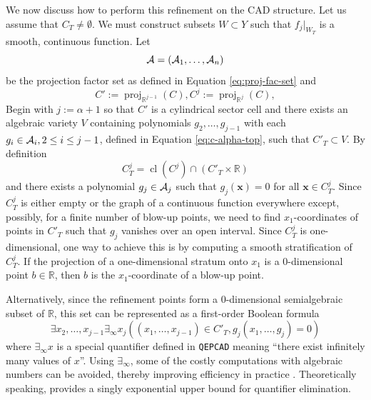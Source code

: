 \documentclass[
]{book}
\theoremstyle{definition}
\theoremstyle{definition}
\theoremstyle{definition}
\theoremstyle{definition}
\theoremstyle{remark}
\begin{document}
We now discuss how to perform this refinement on the CAD structure. Let us assume that \(C_T\ne \emptyset\). We must construct subsets \(W \subset Y\) such that \(f_j\vert_{W_T}\) is a smooth, continuous function.
Let
\[
{\cal A} = ({\cal A}_1, \ldots, {\cal A}_n)
\]
be the projection factor set as defined in Equation \eqref{eq:proj-fac-set} and
\[
C' := {\operatorname{proj}_{\mathbb{R}^{j-1}}}(C), C^j := {\operatorname{proj}_{\mathbb{R}^{j}}}(C),
\]
Begin with \(j := \alpha+1\) so that \(C'\) is a cylindrical sector cell and there exists an algebraic variety \(V\) containing polynomials \(g_2,\ldots,g_{j-1}\) with each \(g_i \in {\cal A}_i, 2 \le i \le j-1\), defined in Equation \eqref{eq:c-alpha-top}, such that \(C'_T\subset V\).
By definition \[
C^j_T = {\operatorname{cl} \left( C^j \right)} \cap (C'_T \times \mathbb{R})
\] and there exists a polynomial \(g_j \in {\cal A}_j\) such that \(g_j(\mathbf{x}) = 0\) for all \(\mathbf{x} \in C^j_T\). Since \(C^j_T\) is either empty or the graph of a continuous function everywhere except, possibly, for a finite number of blow-up points, we need to find \(x_1\)-coordinates of points in \(C'_T\) such that \(g_j\) vanishes over an open interval.
Since \(C^j_T\) is one-dimensional, one way to achieve this is by computing a smooth stratification of \(C^j_T\). If the projection of a one-dimensional stratum onto \(x_1\) is a \(0\)-dimensional point \(b \in \mathbb{R}\), then \(b\) is the \(x_1\)-coordinate of a blow-up point.

Alternatively, since the refinement points form a \(0\)-dimensional semialgebraic subset of \(\mathbb{R}\), this set can be represented as a first-order Boolean formula
\[
\exists x_2,\ldots,x_{j-1} \exists_\infty x_j ((x_1,\ldots,x_{j-1}) \in C'_T, g_j(x_1,\ldots,g_j) = 0)
\]
where \(\exists_\infty x\) is a special quantifier defined in \texttt{QEPCAD} meaning ``there exist infinitely many values of \(x\)''.
Using \(\exists_\infty\), some of the costly computations with algebraic numbers can be avoided, thereby improving efficiency in practice \citep{qepcadDocs}.
Theoretically speaking, \citep[Algorithm 14.21]{bpr2006} provides a singly exponential upper bound for quantifier elimination.
\end{document}
